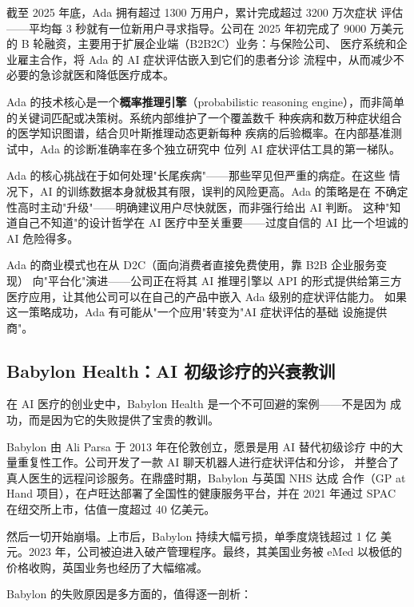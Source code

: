 截至 2025 年底，Ada 拥有超过 1300 万用户，累计完成超过 3200 万次症状
评估——平均每 3 秒就有一位新用户寻求指导。公司在 2025 年初完成了
9000 万美元的 B 轮融资，主要用于扩展企业端（B2B2C）业务：与保险公司、
医疗系统和企业雇主合作，将 Ada 的 AI 症状评估嵌入到它们的患者分诊
流程中，从而减少不必要的急诊就医和降低医疗成本。

Ada 的技术核心是一个\textbf{概率推理引擎}（probabilistic reasoning
engine），而非简单的关键词匹配或决策树。系统内部维护了一个覆盖数千
种疾病和数万种症状组合的医学知识图谱，结合贝叶斯推理动态更新每种
疾病的后验概率。在内部基准测试中，Ada 的诊断准确率在多个独立研究中
位列 AI 症状评估工具的第一梯队。

Ada 的核心挑战在于如何处理"长尾疾病"——那些罕见但严重的病症。在这些
情况下，AI 的训练数据本身就极其有限，误判的风险更高。Ada 的策略是在
不确定性高时主动"升级"——明确建议用户尽快就医，而非强行给出 AI 判断。
这种"知道自己不知道"的设计哲学在 AI 医疗中至关重要——过度自信的 AI
比一个坦诚的 AI 危险得多。

Ada 的商业模式也在从 D2C（面向消费者直接免费使用，靠 B2B 企业服务变现）
向"平台化"演进——公司正在将其 AI 推理引擎以 API 的形式提供给第三方
医疗应用，让其他公司可以在自己的产品中嵌入 Ada 级别的症状评估能力。
如果这一策略成功，Ada 有可能从"一个应用"转变为"AI 症状评估的基础
设施提供商"。


\subsection{Babylon Health：AI 初级诊疗的兴衰教训}
\label{subsec:babylon}

在 AI 医疗的创业史中，Babylon Health 是一个不可回避的案例——不是因为
成功，而是因为它的失败提供了宝贵的教训。

Babylon 由 Ali Parsa 于 2013 年在伦敦创立，愿景是用 AI 替代初级诊疗
中的大量重复性工作。公司开发了一款 AI 聊天机器人进行症状评估和分诊，
并整合了真人医生的远程问诊服务。在鼎盛时期，Babylon 与英国 NHS 达成
合作（GP at Hand 项目），在卢旺达部署了全国性的健康服务平台，并在
2021 年通过 SPAC 在纽交所上市，估值一度超过 40 亿美元。

然后一切开始崩塌。上市后，Babylon 持续大幅亏损，单季度烧钱超过 1 亿
美元。2023 年，公司被迫进入破产管理程序。最终，其美国业务被 eMed
以极低的价格收购，英国业务也经历了大幅缩减。

Babylon 的失败原因是多方面的，值得逐一剖析：

